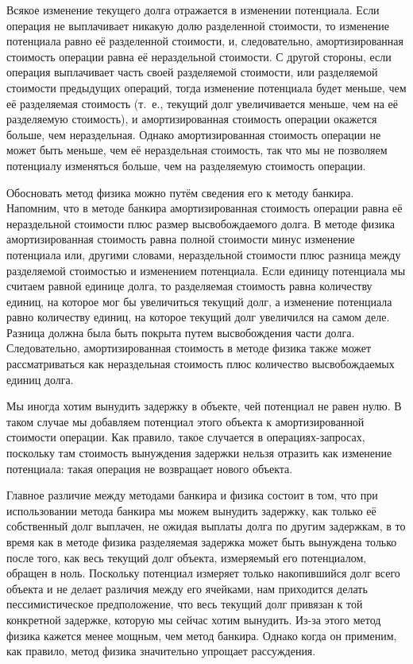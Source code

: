 Всякое изменение текущего долга отражается в изменении потенциала.
Если операция не выплачивает никакую долю разделенной стоимости, то
изменение потенциала равно её разделенной стоимости, и, следовательно,
амортизированная стоимость операции равна её нераздельной стоимости. С
другой стороны, если операция выплачивает часть своей разделяемой
стоимости, или разделяемой стоимости предыдущих операций, тогда
изменение потенциала будет меньше, чем её разделяемая стоимость
(т.~е., текущий долг увеличивается меньше, чем на её разделяемую
стоимость), и амортизированная стоимость операции окажется больше, чем
нераздельная. Однако амортизированная стоимость операции не может быть
меньше, чем её нераздельная стоимость, так что мы не позволяем
потенциалу изменяться больше, чем на разделяемую стоимость операции.

Обосновать метод физика можно путём сведения его к методу
банкира. Напомним, что в методе банкира амортизированная стоимость
операции равна её нераздельной стоимости плюс размер
высвобождаемого долга. В методе физика амортизированная стоимость
равна полной стоимости минус изменение потенциала или, другими
словами, нераздельной стоимости плюс разница между разделяемой
стоимостью и изменением потенциала.  Если единицу потенциала мы
считаем равной единице долга, то разделяемая стоимость равна
количеству единиц, на которое мог бы увеличиться текущий долг, а
изменение потенциала равно количеству единиц, на которое текущий долг
увеличился на самом деле. Разница должна была быть покрыта путем
высвобождения части долга.  Следовательно, амортизированная стоимость
в методе физика также может рассматриваться как нераздельная стоимость
плюс количество высвобождаемых единиц долга.

Мы иногда хотим вынудить задержку в объекте, чей потенциал не равен
нулю. В таком случае мы добавляем потенциал этого объекта к
амортизированной стоимости операции. Как правило, такое случается в
операциях-запросах, поскольку там стоимость вынуждения задержки нельзя
отразить как изменение потенциала: такая операция не возвращает нового
объекта. 

Главное различие между методами банкира и физика состоит в том, что
при использовании метода банкира мы можем вынудить задержку, как только
её собственный долг выплачен, не ожидая выплаты долга по другим
задержкам, в то время как в методе физика разделяемая задержка может
быть вынуждена только после того, как весь текущий долг объекта,
измеряемый его потенциалом, обращен в ноль.  Поскольку потенциал
измеряет только накопившийся долг всего объекта и не делает различия
между его ячейками, нам приходится делать пессимистическое
предположение, что весь текущий долг привязан к той конкретной
задержке, которую мы сейчас хотим вынудить. Из-за этого метод физика
кажется менее мощным, чем метод банкира. Однако когда он применим, как
правило, метод физика значительно упрощает рассуждения.


